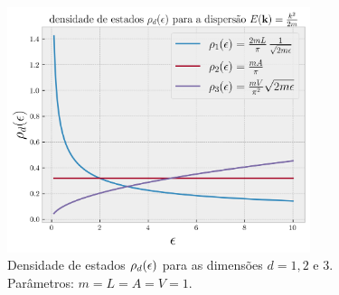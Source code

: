 \documentclass[a4paper,10pt]{article}
\begin{document}
\begin{itemize}
\begin{figure}[H]
\centering
\includegraphics[width=0.79\textwidth]{fig/dos-k2.png}
\caption{Densidade de estados $\rho_d(\epsilon)$ para as dimensões $d = 1, 2$ e $3$. Parâmetros: $m = L = A = V = 1$.}
\label{fig:dosk2}
\end{figure}

\end{itemize}



\pagebreak

\section{}

\pagebreak

\section{}
\end{document}
